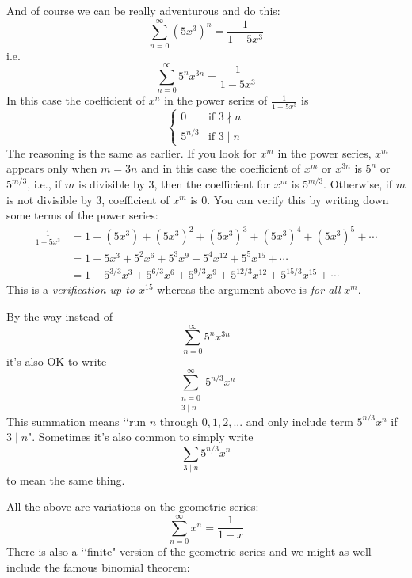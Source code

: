 And of course we can be really adventurous and do this:
\[
  \sum_{n=0}^\infty (5x^3)^n = \frac{1}{1 - 5x^3}
\]
i.e.
\[
  \sum_{n=0}^\infty 5^n x^{3n} = \frac{1}{1 - 5x^3}
\]
In this case the coefficient of $x^n$ in the power series
of $\displaystyle \frac{1}{1 - 5x^3}$
is
\[
  \begin{cases}
    0 & \text{if $3 \nmid n$} \\
    5^{n/3} & \text{if $3 \mid n$}
  \end{cases}
\]
The reasoning is the same as earlier.
If you look for $x^m$ in the power series, $x^m$ appears
only when $m = 3n$
and in this case the coefficient of $x^m$ or $x^{3n}$ is
$5^{n}$ or $5^{m/3}$, i.e., if $m$ is divisible by $3$,
then the coefficient for $x^m$ is $5^{m/3}$.
Otherwise, if $m$ is not divisible by $3$, coefficient of $x^m$ is $0$.
You can verify this by writing down some terms of the power series:
\begin{align*}
  \frac{1}{1 - 5x^3}
  &= 1 + (5x^3) + (5x^3)^2 + (5x^3)^3 + (5x^3)^4 + (5x^3)^5 + \cdots \\
  &= 1 + 5x^3 + 5^2x^6 + 5^3x^9 + 5^4x^{12} + 5^5x^{15} + \cdots \\
  &= 1 + 5^{3/3}x^3 + 5^{6/3}x^6 + 5^{9/3}x^9 + 5^{12/3}x^{12} + 5^{15/3}x^{15} + \cdots
\end{align*}
This is a \textit{verification up to $x^{15}$} whereas the argument above
is \textit{for all} $x^m$.

By the way instead of
\[
  \sum_{n=0}^\infty 5^n x^{3n}
\]
it's also OK to write
\[
  \sum_{\substack{n = 0 \\ 3 \mid n}}^\infty 5^{n/3} x^{n}
\]
This summation means \lq\lq run $n$ through $0,1,2,...$ and
only include term $5^{n/3} x^{n}$ if $3 \mid n$".
Sometimes it's also common to simply write
\[
  \sum_{3 \mid n} 5^{n/3} x^{n}
\]
to mean the same thing.

\newpage
\newpage













\newpage
All the above are variations on the geometric series:
\[
  \sum_{n=0}^\infty x^n = \frac{1}{1 - x}
\]
There is also a \lq\lq finite" version of the geometric series
and we might as well include the famous binomial theorem:

